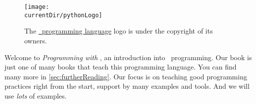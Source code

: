 \hsection{}%
%
%
\begin{figure}%
\centering%
\texttt{[image: \\currentDir/pythonLogo]}%
\caption{The \href{https://www.python.org}{\python\ programming language} logo is under the copyright of its owners.}%
\label{fig:pythonLogo}%
\end{figure}%
%
Welcome to \emph{Programming with \python}, an introduction into \python\ programming.
Our book is just one of many books that teach this programming language.
You can find many more in \cref{sec:furtherReading}.
Our focus is on teaching good programming practices right from the start, support by many examples and tools.
And we will use \emph{lots} of examples.
%
%
%
%
%
\endhsection\endhsection%
%
